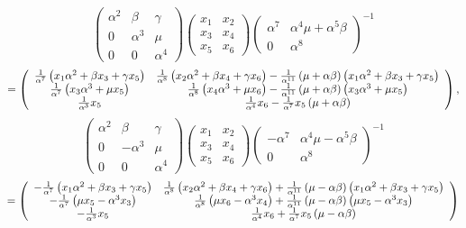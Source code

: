 \documentclass[10pt,thmsa]{article}
\begin{document}
\[
\left( 
\begin{array}{lll}
\alpha ^{2} & \beta & \gamma \\ 
0 & \alpha ^{3} & \mu \\ 
0 & 0 & \alpha ^{4}%
\end{array}%
\right) \left( 
\begin{array}{cc}
x_{1} & x_{2} \\ 
x_{3} & x_{4} \\ 
x_{5} & x_{6}%
\end{array}%
\right) \left( 
\begin{array}{ll}
\alpha ^{7} & \alpha ^{4}\mu +\alpha ^{5}\beta \\ 
0 & \alpha ^{8}%
\end{array}%
\right) ^{-1} 
\]
\[
=\left( 
\begin{array}{cc}
\frac{1}{\alpha ^{7}}\left( x_{1}\alpha ^{2}+\beta x_{3}+\gamma x_{5}\right)
& \frac{1}{\alpha ^{8}}\left( x_{2}\alpha ^{2}+\beta x_{4}+\gamma
x_{6}\right) -\frac{1}{\alpha ^{11}}\left( \mu +\alpha \beta \right) \left(
x_{1}\alpha ^{2}+\beta x_{3}+\gamma x_{5}\right) \\ 
\frac{1}{\alpha ^{7}}\left( x_{3}\alpha ^{3}+\mu x_{5}\right) & \frac{1}{%
\alpha ^{8}}\left( x_{4}\alpha ^{3}+\mu x_{6}\right) -\frac{1}{\alpha ^{11}}%
\left( \mu +\alpha \beta \right) \left( x_{3}\alpha ^{3}+\mu x_{5}\right) \\ 
\frac{1}{\alpha ^{3}}x_{5} & \frac{1}{\alpha ^{4}}x_{6}-\frac{1}{\alpha ^{7}}%
x_{5}\left( \mu +\alpha \beta \right)%
\end{array}%
\right) \allowbreak , 
\]%
\[
\left( 
\begin{array}{lll}
\alpha ^{2} & \beta & \gamma \\ 
0 & -\alpha ^{3} & \mu \\ 
0 & 0 & \alpha ^{4}%
\end{array}%
\right) \left( 
\begin{array}{cc}
x_{1} & x_{2} \\ 
x_{3} & x_{4} \\ 
x_{5} & x_{6}%
\end{array}%
\right) \left( 
\begin{array}{ll}
-\alpha ^{7} & \alpha ^{4}\mu -\alpha ^{5}\beta \\ 
0 & \alpha ^{8}%
\end{array}%
\right) ^{-1} 
\]
\[
=\left( 
\begin{array}{cc}
-\frac{1}{\alpha ^{7}}\left( x_{1}\alpha ^{2}+\beta x_{3}+\gamma x_{5}\right)
& \frac{1}{\alpha ^{8}}\left( x_{2}\alpha ^{2}+\beta x_{4}+\gamma
x_{6}\right) +\frac{1}{\alpha ^{11}}\left( \mu -\alpha \beta \right) \left(
x_{1}\alpha ^{2}+\beta x_{3}+\gamma x_{5}\right) \\ 
-\frac{1}{\alpha ^{7}}\left( \mu x_{5}-\alpha ^{3}x_{3}\right) & \frac{1}{%
\alpha ^{8}}\left( \mu x_{6}-\alpha ^{3}x_{4}\right) +\frac{1}{\alpha ^{11}}%
\left( \mu -\alpha \beta \right) \left( \mu x_{5}-\alpha ^{3}x_{3}\right) \\ 
-\frac{1}{\alpha ^{3}}x_{5} & \frac{1}{\alpha ^{4}}x_{6}+\frac{1}{\alpha ^{7}%
}x_{5}\left( \mu -\alpha \beta \right)%
\end{array}%
\right) 
\]%
$\allowbreak $
\end{document}
